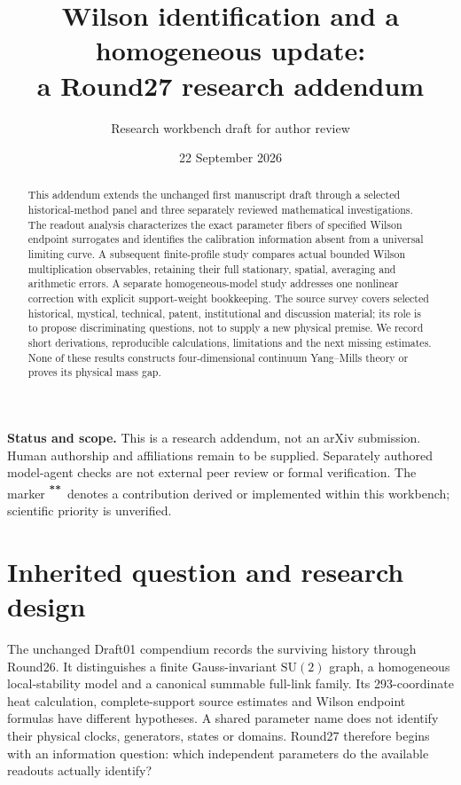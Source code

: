 \documentclass[11pt,a4paper]{article}
\title{Wilson identification and a homogeneous update:\\a Round27 research addendum}
\author{Research workbench draft for author review}
\date{22 September 2026}
\newcommand{\workstar}{\textsuperscript{\textbf{**}}}
\begin{document}
\maketitle
\begin{abstract}
This addendum extends the unchanged first manuscript draft through a selected historical-method panel and three separately reviewed mathematical investigations. The readout analysis characterizes the exact parameter fibers of specified Wilson endpoint surrogates and identifies the calibration information absent from a universal limiting curve. A subsequent finite-profile study compares actual bounded Wilson multiplication observables, retaining their full stationary, spatial, averaging and arithmetic errors. A separate homogeneous-model study addresses one nonlinear correction with explicit support-weight bookkeeping. The source survey covers selected historical, mystical, technical, patent, institutional and discussion material; its role is to propose discriminating questions, not to supply a new physical premise. We record short derivations, reproducible calculations, limitations and the next missing estimates. None of these results constructs four-dimensional continuum Yang--Mills theory or proves its physical mass gap.
\end{abstract}
\vspace{2mm}
\begin{center}\small
\textbf{Status and scope.} This is a research addendum, not an arXiv submission. Human authorship and affiliations remain to be supplied. Separately authored model-agent checks are not external peer review or formal verification. The marker \workstar\ denotes a contribution derived or implemented within this workbench; scientific priority is unverified.
\end{center}

\section{Inherited question and research design}
The unchanged Draft01 compendium records the surviving history through Round26. It distinguishes a finite Gauss-invariant $\mathrm{SU}(2)$ graph, a homogeneous local-stability model and a canonical summable full-link family. Its 293-coordinate heat calculation, complete-support source estimates and Wilson endpoint formulas have different hypotheses. A shared parameter name does not identify their physical clocks, generators, states or domains. Round27 therefore begins with an information question: which independent parameters do the available readouts actually identify?
\end{document}
